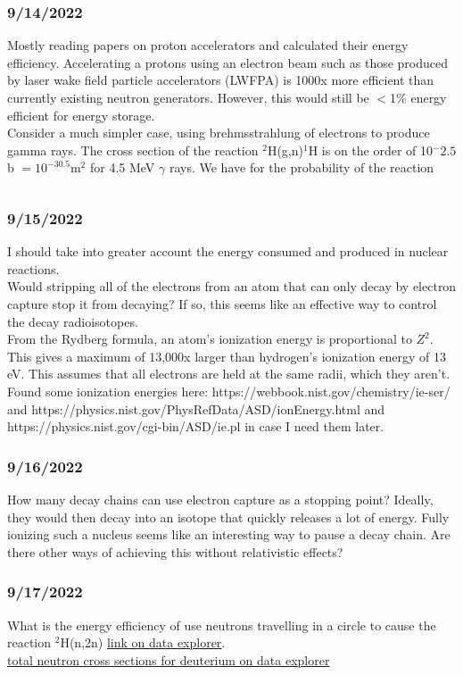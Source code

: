\documentclass[12pt]{article}
\begin{document}
\subsubsection{9/14/2022}
Mostly reading papers on proton accelerators and calculated their energy efficiency. Accelerating a protons using an electron beam such as those produced by laser wake field particle accelerators (LWFPA) is 1000x more efficient than currently existing neutron generators. However, this would still be $<$1\% energy efficient for energy storage. \\
Consider a much simpler case, using brehmsstrahlung of electrons to produce gamma rays. The cross section of the reaction $^2$H(g,n)$ ^1$H is on the order of 10$^-2.5$b $= 10^{-30.5}$m$^2$ for 4.5 MeV $\gamma$ rays. We have for the probability of the reaction 
\begin{equation}
\begin{split}
\\
\end{split}
\end{equation}
\subsubsection{9/15/2022}
I should take into greater account the energy consumed and produced in nuclear reactions. \\
Would stripping all of the electrons from an atom that can only decay by electron capture stop it from decaying? If so, this seems like an effective way to control the decay radioisotopes.\\
From the Rydberg formula, an atom's ionization energy is proportional to $Z^2$. This gives a maximum of 13,000x larger than hydrogen's ionization energy of 13 eV. This assumes that all electrons are held at the same radii, which they aren't. 
Found some ionization energies here: https://webbook.nist.gov/chemistry/ie-ser/ and https://physics.nist.gov/PhysRefData/ASD/ionEnergy.html and https://physics.nist.gov/cgi-bin/ASD/ie.pl in case I need them later. 
\subsubsection{9/16/2022}
How many decay chains can use electron capture as a stopping point? Ideally, they would then decay into an isotope that quickly releases a lot of energy. Fully ionizing such a nucleus seems like an interesting way to pause a decay chain. Are there other ways of achieving this without relativistic effects? 
\subsubsection{9/17/2022}
What is the energy efficiency of use neutrons travelling in a circle to cause the reaction $^2$H(n,2n) \href{https://www-nds.iaea.org/dataexplorer/?target_elem=H&target_mass=2&reaction=n\%2C2n}{link on data explorer}.\\
\href{https://www-nds.iaea.org/dataexplorer/?target_elem=H&target_mass=2&reaction=n\%2Ctotal}{total neutron cross sections for deuterium on data explorer}
\end{document}
